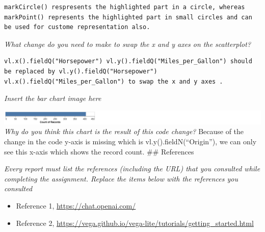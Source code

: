 \documentclass[
]{article}
\providecommand{\tightlist}{%
  \setlength{\itemsep}{0pt}\setlength{\parskip}{0pt}}
\begin{document}
\begin{verbatim}
markCircle() respresents the highlighted part in a circle, whereas markPoint() represents the highlighted part in small circles and can be used for custome representation also.
\end{verbatim}

\emph{What change do you need to make to swap the x and y axes on the
scatterplot?}

\begin{verbatim}
vl.x().fieldQ("Horsepower") vl.y().fieldQ("Miles_per_Gallon") should be replaced by vl.y().fieldQ("Horsepower") vl.x().fieldQ("Miles_per_Gallon") to swap the x and y axes .
\end{verbatim}

\emph{Insert the bar chart image here}

\includegraphics{vega-chart.png} \emph{Why do you think this chart is
the result of this code change?} Because of the change in the code
y-axis is missing which is vl.y().fieldN(``Origin''), we can only see
this x-axis which shows the record count. \#\# References

\emph{Every report must list the references (including the URL) that you
consulted while completing the assignment. Replace the items below with
the references you consulted}

\begin{itemize}
\tightlist
\item
  Reference 1, \url{https://chat.openai.com/}
\item
  Reference 2,
  \url{https://vega.github.io/vega-lite/tutorials/getting_started.html}
\end{itemize}
\end{document}
